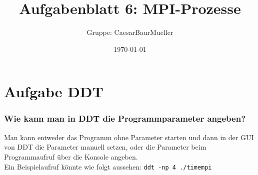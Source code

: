 \documentclass[12pt]{article}
\title{Aufgabenblatt 6: MPI-Prozesse}
\author{Gruppe: CaesarBaurMueller}
\date{\today}
\begin{document}
\maketitle

\begin{sloppypar}
    
\section*{Aufgabe DDT}
\subsubsection*{Wie kann man in DDT die Programmparameter angeben?}
Man kann entweder das Programm ohne Parameter starten und dann in der GUI von DDT die Parameter manuell setzen, oder die Parameter beim Programmaufruf über die Konsole angeben. \\
Ein Beispielaufruf könnte wie folgt aussehen: \verb|ddt -np 4 ./timempi|\\


\end{sloppypar}
\end{document}
